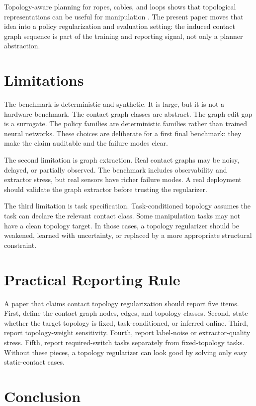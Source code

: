 \documentclass{article}
\begin{document}
Topology-aware planning for ropes, cables, and loops shows that topological representations can be useful for manipulation \citep{mitrano2024grasploop}. The present paper moves that idea into a policy regularization and evaluation setting: the induced contact graph sequence is part of the training and reporting signal, not only a planner abstraction.

\section{Limitations}

The benchmark is deterministic and synthetic. It is large, but it is not a hardware benchmark. The contact graph classes are abstract. The graph edit gap is a surrogate. The policy families are deterministic families rather than trained neural networks. These choices are deliberate for a first final benchmark: they make the claim auditable and the failure modes clear.

The second limitation is graph extraction. Real contact graphs may be noisy, delayed, or partially observed. The benchmark includes observability and extractor stress, but real sensors have richer failure modes. A real deployment should validate the graph extractor before trusting the regularizer.

The third limitation is task specification. Task-conditioned topology assumes the task can declare the relevant contact class. Some manipulation tasks may not have a clean topology target. In those cases, a topology regularizer should be weakened, learned with uncertainty, or replaced by a more appropriate structural constraint.

\section{Practical Reporting Rule}

A paper that claims contact topology regularization should report five items. First, define the contact graph nodes, edges, and topology classes. Second, state whether the target topology is fixed, task-conditioned, or inferred online. Third, report topology-weight sensitivity. Fourth, report label-noise or extractor-quality stress. Fifth, report required-switch tasks separately from fixed-topology tasks. Without these pieces, a topology regularizer can look good by solving only easy static-contact cases.

\section{Conclusion}
\end{document}
